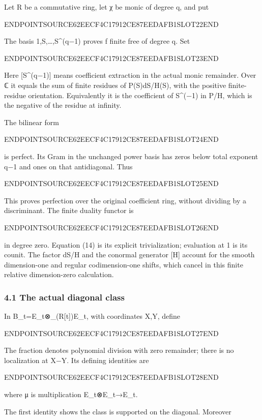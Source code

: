 Let R be a commutative ring, let χ be monic of degree q, and put

ENDPOINTSOURCE62EECF4C17912CE87EEDAFB1SLOT22END

The basis 1,S,\ldots,S\^{}(q−1) proves f finite free of degree q. Set

ENDPOINTSOURCE62EECF4C17912CE87EEDAFB1SLOT23END

Here {[}S\^{}(q−1){]} means coefficient extraction in the actual monic remainder. Over ℂ it equals the sum of finite residues of P(S)dS/H(S), with the positive finite-residue orientation. Equivalently it is the coefficient of S\^{}(−1) in P/H, which is the negative of the residue at infinity.

The bilinear form

ENDPOINTSOURCE62EECF4C17912CE87EEDAFB1SLOT24END

is perfect. Its Gram in the unchanged power basis has zeros below total exponent q−1 and ones on that antidiagonal. Thus

ENDPOINTSOURCE62EECF4C17912CE87EEDAFB1SLOT25END

This proves perfection over the original coefficient ring, without dividing by a discriminant. The finite duality functor is

ENDPOINTSOURCE62EECF4C17912CE87EEDAFB1SLOT26END

in degree zero. Equation (14) is its explicit trivialization; evaluation at 1 is its counit. The factor dS/H and the conormal generator {[}H{]} account for the smooth dimension-one and regular codimension-one shifts, which cancel in this finite relative dimension-zero calculation.

\subsubsection{4.1 The actual diagonal class}\label{endpoint-sga_trace_period--the-actual-diagonal-class}

In B\_t=E\_t⊗\_(R{[}t{]})E\_t, with coordinates X,Y, define

ENDPOINTSOURCE62EECF4C17912CE87EEDAFB1SLOT27END

The fraction denotes polynomial division with zero remainder; there is no localization at X−Y. Its defining identities are

ENDPOINTSOURCE62EECF4C17912CE87EEDAFB1SLOT28END

where μ is multiplication E\_t⊗E\_t→E\_t.

The first identity shows the class is supported on the diagonal. Moreover

